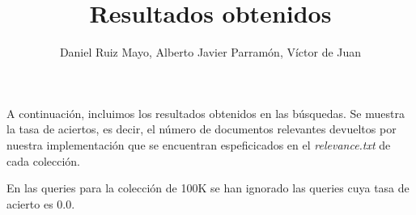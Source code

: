 \documentclass[palatino,nochap]{apuntes}
\title{Resultados obtenidos}
\author{Daniel Ruiz Mayo, Alberto Javier Parramón, Víctor de Juan}
\date{}
\begin{document}
\pagestyle{plain}
\maketitle
A continuación, incluimos los resultados obtenidos en las búsquedas. Se muestra la tasa de aciertos, es decir, el número de documentos relevantes devueltos por nuestra implementación que se encuentran espeficicados en el \textit{relevance.txt} de cada colección.

En las queries para la colección de 100K se han ignorado las queries cuya tasa de acierto es 0.0.




\appendix
\end{document}
